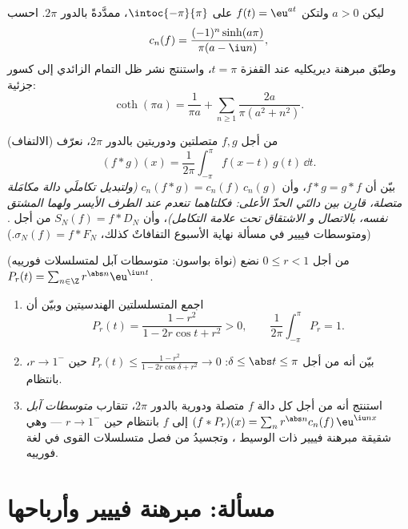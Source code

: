 \begin{exercise}[$\star\star$]\label{exo:b2:fourier:10}
ليكن $a > 0$ ولتكن $f(t) = \eu^{at}$ على $\intoc{-\pi}{\pi}$،
ممدَّدةً بالدور $2\pi$. احسب
\[
c_n(f) = \frac{(-1)^n\sinh(a\pi)}{\pi(a - \iu n)} ,
\]
وطبّق مبرهنة ديريكليه عند القفزة $t = \pi$، واستنتج
نشر ظل التمام الزائدي إلى كسور جزئية:
\[
\coth(\pi a) = \frac{1}{\pi a} + \sum_{n\geq1}
\frac{2a}{\pi(a^2 + n^2)} .
\]
\end{exercise}

\begin{exercise}[$\star\star$]\label{exo:b2:fourier:11}
(الالتفاف) من أجل $f, g$ متصلتين ودوريتين بالدور $2\pi$، نعرّف
\[
(f * g)(x) = \frac{1}{2\pi}\int_{-\pi}^{\pi} f(x - t)\,g(t)\,
\dd t .
\]
بيّن أن $f * g = g * f$، وأن $c_n(f*g) = c_n(f)\,c_n(g)$
\emph{(ولتبديل تكاملَي دالة مكامَلة متصلة،
قارِن بين دالتَي الحدّ الأعلى: فكلتاهما تنعدم عند
الطرف الأيسر ولهما المشتق نفسه، بالاتصال و
الاشتقاق تحت علامة التكامل)}، وأن $S_N(f) =
f * D_N$ من أجل . (ومتوسطات فييير في مسألة نهاية
الأسبوع التفافاتٌ كذلك، $\sigma_N(f) = f *
F_N$.)
\end{exercise}

\begin{exercise}[$\star\star\star$]\label{exo:b2:fourier:12}
(نواة بواسون: متوسطات آبل لمتسلسلات فورييه) من أجل $0 \leq r <
1$ نضع $P_r(t) = \sum_{n\in\Z} r^{\abs n}\eu^{\iu nt}$.
\begin{enumerate}
  \item اجمع المتسلسلتين الهندسيتين وبيّن أن
        \[
        P_r(t) = \frac{1 - r^2}{1 - 2r\cos t + r^2} > 0,
        \qquad
        \frac{1}{2\pi}\int_{-\pi}^{\pi}P_r = 1 .
        \]
  \item بيّن أنه من أجل $\delta \leq \abs t \leq \pi$: $P_r(t)
        \leq \frac{1 - r^2}{1 - 2r\cos\delta + r^2} \to 0$ حين
        $r \to 1^-$، بانتظام.
  \item استنتج أنه من أجل كل دالة $f$ متصلة ودورية بالدور $2\pi$،
        تتقارب \emph{متوسطات آبل} $(f * P_r)(x) = \sum_n
        r^{\abs n}c_n(f)\,\eu^{\iu nx}$ إلى $f$
        بانتظام حين $r \to 1^-$ --- وهي شقيقة مبرهنة فييير
        ذات الوسيط ، وتجسيدُ 
        من فصل متسلسلات القوى في لغة فورييه.
\end{enumerate}
\end{exercise}

\section{مسألة: مبرهنة فييير وأرباحها}

